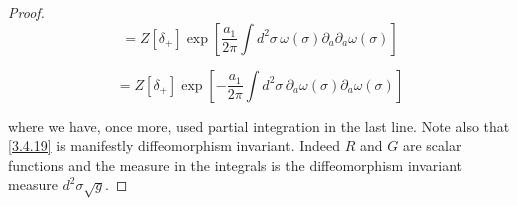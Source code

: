 \begin{tcolorbox}[breakable]
\begin{proof}
		\begin{equation}
			= Z[\delta_+] \exp \left[ \frac{a_1}{2\pi} \int d^2\sigma \, \omega(\sigma) \partial_a \partial_a \omega(\sigma) \right]
		\end{equation}
		
		\begin{equation}
			= Z[\delta_+] \exp \left[ -\frac{a_1}{2\pi} \int d^2\sigma \, \partial_a \omega(\sigma) \partial_a \omega(\sigma) \right]
		\end{equation}
		
		where we have, once more, used partial integration in the last line. Note also that \eqref{3.4.19} is manifestly diffeomorphism invariant. Indeed \( R \) and \( G \) are scalar functions and the measure in the integrals is the diffeomorphism invariant measure \( d^2\sigma \sqrt{g} \).
	\end{proof}
\end{tcolorbox}

